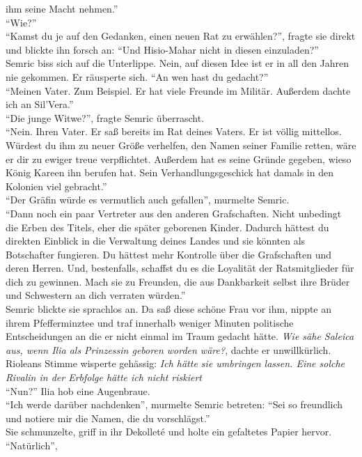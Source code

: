 ihm seine Macht nehmen.''\\
``Wie?''\\
``Kamst du je auf den Gedanken, einen neuen Rat zu erwählen?'', fragte sie direkt und blickte ihn 
forsch an: ``Und Hisio-Mahar nicht in diesen einzuladen?''\\
Semric biss sich auf die Unterlippe. Nein, auf diesen Idee ist er in all den Jahren nie gekommen. 
Er räusperte sich. ``An wen hast du gedacht?''\\
``Meinen Vater. Zum Beispiel. Er hat viele Freunde im Militär. Außerdem dachte ich an Sil'Vera.''\\
``Die junge Witwe?'', fragte Semric überrascht.\\
``Nein. Ihren Vater. Er saß bereits im Rat deines Vaters. Er ist völlig mittellos. Würdest du ihm 
zu neuer Größe verhelfen, den Namen seiner Familie retten, wäre er dir zu ewiger treue 
verpflichtet. Außerdem hat es seine Gründe gegeben, wieso König Kareen ihn berufen hat. Sein 
Verhandlungsgeschick hat damals in den Kolonien viel gebracht.''\\
``Der Gräfin würde es vermutlich auch gefallen'', murmelte Semric.\\
``Dann noch ein paar Vertreter aus den anderen Grafschaften. Nicht unbedingt die Erben des Titels, 
eher die später geborenen Kinder. Dadurch hättest du direkten Einblick in die Verwaltung deines 
Landes und sie könnten als Botschafter fungieren. Du hättest mehr Kontrolle über die Grafschaften 
und deren Herren. Und, bestenfalls, schaffst du es die Loyalität der Ratsmitglieder für dich zu 
gewinnen. Mach sie zu Freunden, die aus Dankbarkeit selbst ihre Brüder und Schwestern an dich 
verraten würden.''\\
Semric blickte sie sprachlos an. Da saß diese schöne Frau vor ihm, nippte an ihrem Pfefferminztee 
und traf innerhalb weniger Minuten politische Entscheidungen an die er nicht einmal im Traum 
gedacht hätte. \textit{Wie sähe Saleica aus, wenn Ilia als Prinzessin geboren worden wäre?}, dachte 
er unwillkürlich.
Rioleans Stimme wisperte gehässig: \textit{Ich hätte sie umbringen lassen. Eine solche Rivalin in 
der Erbfolge hätte ich nicht riskiert}\\
``Nun?'' Ilia hob eine Augenbraue.\\
``Ich werde darüber nachdenken'', murmelte Semric betreten: ``Sei so freundlich und notiere mir die 
Namen, die du vorschlägst.''\\
Sie schmunzelte, griff in ihr Dekolleté und holte ein gefaltetes Papier hervor. ``Natürlich'', 
